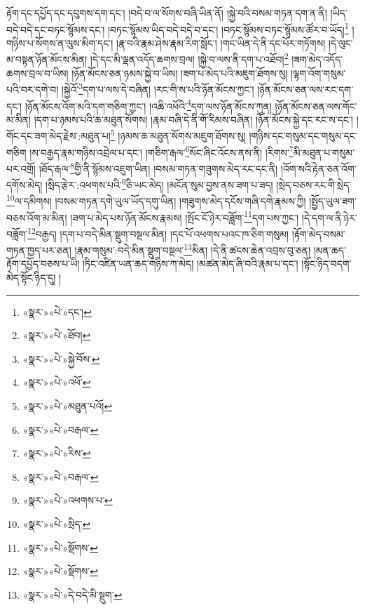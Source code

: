 རྟོག་དང་དཔྱོད་དང་དབུགས་དག་དང་། །བདེ་བ་ལ་སོགས་བཞི་ཡིན་ནོ། །སྐྱེ་བའི་བསམ་གཏན་དག་ན་ནི། །ཡིད་བདེ་བདེ་དང་བཏང་སྙོམས་དང་། །བཏང་སྙོམས་ཡིད་བདེ་བདེ་བ་དང་། །བཏང་སྙོམས་བཏང་སྙོམས་ཚོར་བ་ཡོད།\footnote{«སྣར་»«པེ་»དང་།} །གཉིས་པ་སོགས་ན་ལུས་མིག་དང་། །རྣ་བའི་རྣམ་ཤེས་རྣམ་རིག་སློང་། །གང་ཡིན་དེ་ནི་དང་པོར་གཏོགས། །དེ་ལུང་མ་བསྟན་ཉོན་མོངས་མིན། །དེ་དང་མི་ལྡན་འདོད་ཆགས་བྲལ། །སྐྱེ་བ་ལས་ནི་དག་པ་འཐོབ།\footnote{«སྣར་»«པེ་»ཐོབ།} །ཟག་མེད་འདོད་ཆགས་བྲལ་བ་ཡིས། །ཉོན་མོངས་ཅན་ཉམས་སྐྱེ་བ་ཡིས། །ཟག་པ་མེད་པའི་མཇུག་ཐོགས་སུ། །ལྟག་འོག་གསུམ་པའི་བར་དགེ་བ། །སྐྱེའོ་\footnote{«སྣར་»«པེ་»སྐྱེ་བོས་}དག་པ་ལས་དེ་བཞིན། །རང་གི་ས་པའི་ཉོན་མོངས་ཀྱང་། །ཉོན་མོངས་ཅན་ལས་རང་དག་དང་། །ཉོན་མོངས་འོག་མའི་དག་གཅིག་ཀྱང་། །འཆི་འཕོའི་\footnote{«སྣར་»«པེ་»འཕོ་}དག་ལས་ཉོན་མོངས་ཀུན། །ཉོན་མོངས་ཅན་ལས་གོང་མ་མིན། །དག་པ་ཉམས་པའི་ཆ་མཐུན་སོགས། །རྣམ་བཞི་དེ་ནི་གོ་རིམས་བཞིན། །ཉོན་མོངས་སྐྱེ་དང་རང་ས་དང་། །གོང་དང་ཟག་མེད་རྗེས་:མཐུན་པ།\footnote{«སྣར་»«པེ་»མཐུན་པའོ།} །ཉམས་ཆ་མཐུན་སོགས་མཇུག་ཐོགས་སུ། །གཉིས་དང་གསུམ་དང་གསུམ་དང་གཅིག །ས་བརྒྱད་རྣམ་གཉིས་འབྲེལ་པ་དང་། །གཅིག་རྒལ་\footnote{«སྣར་»«པེ་»བརྒལ་}སོང་ཞིང་འོངས་ནས་ནི། །རིགས་\footnote{«སྣར་»«པེ་»རིས་}མི་མཐུན་པ་གསུམ་པར་འགྲོ། །ཐོད་རྒལ་\footnote{«སྣར་»«པེ་»བརྒལ་}གྱི་ནི་སྙོམས་འཇུག་ཡིན། །བསམ་གཏན་གཟུགས་མེད་རང་དང་ནི། །འོག་སའི་རྟེན་ཅན་འོག་དགོས་མེད། །སྲིད་རྩེར་:འཕགས་པའི་\footnote{«སྣར་»«པེ་»འཕགས་པ་}ཅི་ཡང་མེད། །མངོན་སུམ་བྱས་ནས་ཟག་པ་ཟད། །སྲེད་བཅས་རང་གི་སྲེད་\footnote{«སྣར་»«པེ་»སྲིད་}ལ་དམིགས། །བསམ་གཏན་དགེ་ཡུལ་ཡོད་དགུ་ཡིན། །གཟུགས་མེད་དངོས་གཞི་དགེ་རྣམས་ཀྱི། །སྤྱོད་ཡུལ་ཟག་བཅས་འོག་མ་མིན། །ཟག་པ་མེད་པས་ཉོན་མོངས་རྣམས། །སྤོང་ངོ་ཉེར་བཟློག་\footnote{«སྣར་»«པེ་»སྡོགས་}དག་པས་ཀྱང་། །དེ་དག་ལ་ནི་ཉེར་བཟློག་\footnote{«སྣར་»«པེ་»སྡོགས་}བརྒྱད། །དག་པ་བདེ་མིན་སྡུག་བསྔལ་མིན། །དང་པོ་འཕགས་པའང་ཁ་ཅིག་གསུམ། །རྟོག་མེད་བསམ་གཏན་ཁྱད་པར་ཅན། །རྣམ་གསུམ་:བདེ་མིན་སྡུག་བསྔལ་\footnote{«སྣར་»«པེ་»དེ་བདེ་མི་སྡུག་}མིན། །དེ་ནི་ཚངས་ཆེན་འབྲས་བུ་ཅན། །མན་ཆད་རྟོག་དཔྱོད་བཅས་པ་ཡི། །ཏིང་འཛིན་ཡན་ཆད་གཉིས་ཀ་མེད། །མཚན་མེད་ཞི་བའི་རྣམ་པ་དང་། །སྟོང་ཉིད་བདག་མེད་སྟོང་ཉིད་དུ། །
